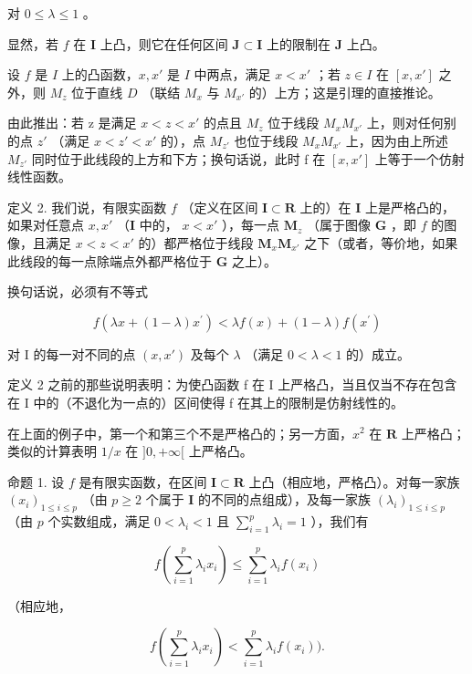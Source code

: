 对 \(0 \leqslant \lambda \leqslant 1\) 。

显然，若 \(f\) 在 \(\mathbf{I}\) 上凸，则它在任何区间 \(\mathbf{J} \subset \mathbf{I}\) 上的限制在 \(\mathbf{J}\) 上凸。

设 \(f\) 是 \(I\) 上的凸函数，\(x, x'\) 是 \(I\) 中两点，满足 \(x < x'\) ；若 \(z \in I\) 在 \([x, x']\) 之外，则 \(M_z\) 位于直线 \(D\) （联结 \(M_x\) 与 \(M_{x'}\) 的）上方；这是引理的直接推论。

由此推出：若 z 是满足 \(x < z < x'\) 的点且 \(M_{z}\) 位于线段 \(M_{x}M_{x'}\) 上，则对任何别的点 \(z'\) （满足 \(x < z' < x'\) 的），点 \(M_{z'}\) 也位于线段 \(M_{x}M_{x'}\) 上，因为由上所述 \(M_{z'}\) 同时位于此线段的上方和下方；换句话说，此时 f 在 \([x, x']\) 上等于一个仿射线性函数。

定义 2. 我们说，有限实函数 \(f\) （定义在区间 \(\mathbf{I} \subset \mathbf{R}\) 上的）在 \(\mathbf{I}\) 上是严格凸的，如果对任意点 \(x, x'\) （\(\mathbf{I}\) 中的， \(x < x'\) ），每一点 \(\mathbf{M}_z\) （属于图像 \(\mathbf{G}\) ，即 \(f\) 的图像，且满足 \(x < z < x'\) 的）都严格位于线段 \(\mathbf{M}_x\mathbf{M}_{x'}\) 之下（或者，等价地，如果此线段的每一点除端点外都严格位于 \(\mathbf{G}\) 之上）。

换句话说，必须有不等式

\[
f (\lambda x + (1 - \lambda) x ^ {\prime}) <   \lambda f (x) + (1 - \lambda) f (x ^ {\prime})\tag{2}
\]

对 I 的每一对不同的点 \((x, x')\) 及每个 \(\lambda\) （满足 \(0 < \lambda < 1\) 的）成立。

定义 2 之前的那些说明表明：为使凸函数 f 在 I 上严格凸，当且仅当不存在包含在 I 中的（不退化为一点的）区间使得 f 在其上的限制是仿射线性的。

在上面的例子中，第一个和第三个不是严格凸的；另一方面，\(x^2\) 在 \(\mathbf{R}\) 上严格凸；类似的计算表明 \(1 / x\) 在 \(]0, +\infty[\) 上严格凸。

命题 1. 设 \(f\) 是有限实函数，在区间 \(\mathbf{I} \subset \mathbf{R}\) 上凸（相应地，严格凸）。对每一家族 \((x_i)_{1 \leqslant i \leqslant p}\) （由 \(p \geqslant 2\) 个属于 \(\mathbf{I}\) 的不同的点组成），及每一家族 \((\lambda_i)_{1 \leqslant i \leqslant p}\) （由 \(p\) 个实数组成，满足 \(0 < \lambda_i < 1\) 且 \(\sum_{i=1}^{p} \lambda_i = 1\) ），我们有

\[
f \left(\sum_ {i = 1} ^ {p} \lambda_ {i} x _ {i}\right) \leqslant \sum_ {i = 1} ^ {p} \lambda_ {i} f (x _ {i})\tag{3}
\]

（相应地，

\[
f \left(\sum_ {i = 1} ^ {p} \lambda_ {i} x _ {i}\right) <   \sum_ {i = 1} ^ {p} \lambda_ {i} f (x _ {i})).\tag{4}
\]


